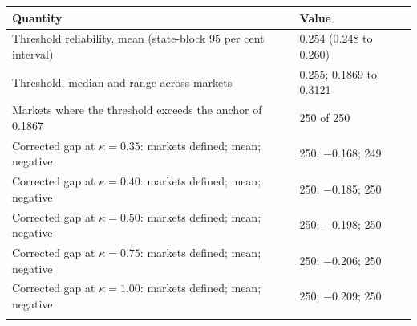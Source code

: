 \setlength{\tabcolsep}{4pt}
\begin{tabular}{@{}p{9.5cm}p{5cm}@{}}
\toprule
Quantity & Value\\
\midrule
Threshold reliability, mean (state-block 95 per cent interval) & 0.254 (0.248 to 0.260)\\
Threshold, median and range across markets & 0.255; 0.1869 to 0.3121\\
Markets where the threshold exceeds the anchor of 0.1867 & 250 of 250\\
Corrected gap at $\kappa = 0.35$: markets defined; mean; negative & 250; $-$0.168; 249\\
Corrected gap at $\kappa = 0.40$: markets defined; mean; negative & 250; $-$0.185; 250\\
Corrected gap at $\kappa = 0.50$: markets defined; mean; negative & 250; $-$0.198; 250\\
Corrected gap at $\kappa = 0.75$: markets defined; mean; negative & 250; $-$0.206; 250\\
Corrected gap at $\kappa = 1.00$: markets defined; mean; negative & 250; $-$0.209; 250\\
\botrule
\end{tabular}

